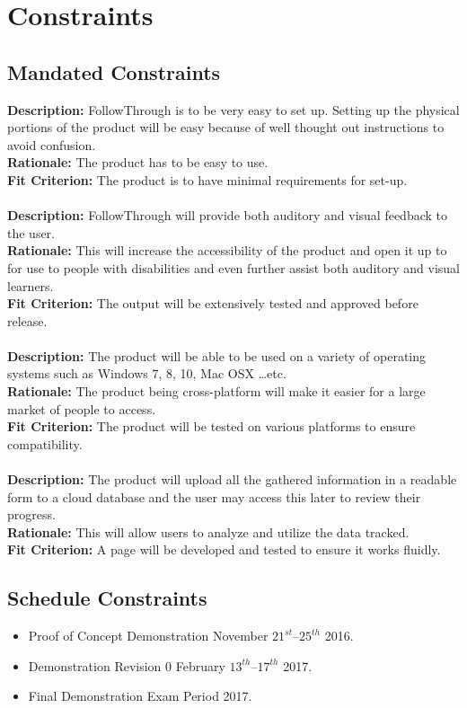 \section{Constraints}
\subsection{Mandated Constraints}
\textbf{Description:} FollowThrough is to be very easy to set up. Setting up the physical portions of the product will be easy because of well thought out instructions to avoid confusion.\\
\textbf{Rationale:} The product has to be easy to use.\\
\textbf{Fit Criterion:} The product is to have minimal requirements for set-up.\\\\
\textbf{Description:} FollowThrough will provide both auditory and visual feedback to the user.\\
\textbf{Rationale:} This will increase the accessibility of the product and open it up to for use to people with disabilities and even further assist both auditory and visual learners.\\
\textbf{Fit Criterion:} The output will be extensively tested and approved before release.\\\\
\textbf{Description:} The product will be able to be used on a variety of operating systems such as Windows 7, 8, 10, Mac OSX …etc.\\
\textbf{Rationale:} The product being cross-platform will make it easier for a large market of people to access.\\
\textbf{Fit Criterion:} The product will be tested on various platforms to ensure compatibility.\\\\
\textbf{Description:} The product will upload all the gathered information in a readable form to a cloud database and the user may access this later to review their progress.\\
\textbf{Rationale:} This will allow users to analyze and utilize the data tracked.\\
\textbf{Fit Criterion:} A page will be developed and tested to ensure it works fluidly.
\subsection{Schedule Constraints}
\begin{itemize}
    \item Proof of Concept Demonstration November $21^{st} – 25^{th}$ 2016.
    \item Demonstration Revision 0 February $13^{th} – 17^{th}$ 2017.
    \item Final Demonstration Exam Period 2017.
\end{itemize}

